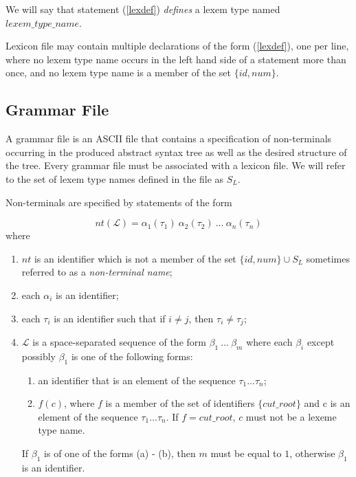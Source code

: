\documentclass[a4paper,10pt]{article}
\begin{document}
We will say that statement (\ref{lexdef}) \textit{defines} a lexem type named $lexem\_type\_name$.

Lexicon file may contain multiple declarations of the form (\ref{lexdef}), one per line, where no lexem type name occurs in the left hand side of a statement more than once, and no lexem type name is a member of the set $\{id, num\}  $.
 
\subsection{Grammar File}\label{gf}
A grammar file is an ASCII file that contains a specification of non-terminals occurring in the produced abstract syntax tree as well as the desired structure of the tree. Every grammar file must be associated with a lexicon file. We will refer to the set of lexem type names defined in the file as $S_L$.  

Non-terminals are specified  by  statements of the form 

\begin{equation}\label{nontd}
nt(\mathcal{L}) = \alpha_1(\tau_1)~\alpha_2(\tau_2)~\ldots~\alpha_n(\tau_n) 
\end{equation}
where 
\begin{enumerate}
\item $nt$ is an identifier which is not a member of the set $\{id,num\}\cup S_L$ sometimes referred to as a \textit{non-terminal name};
\item each $\alpha_i$  is an identifier;
\item each $\tau_i$ is an identifier such that if $i \not=j$, then $\tau_i \not= \tau_j$;
\item $\mathcal{L}$ is a  space-separated sequence  of the form $\beta_1~\ldots~\beta_m$ where
  each  $\beta_i$ except possibly $\beta_1$   
is one of the following forms:
\begin{enumerate}
\item an identifier that is an element of the sequence   $\tau_1\ldots \tau_n$;
\item $f(c)$, where $f$ is a member of the set of identifiers $\{cut\_root\}$ and c is an element of  the sequence   $\tau_1\ldots \tau_n$.
If $f = cut\_root$, $c$ must not be a lexeme type name. 
\end{enumerate} 
 If $\beta_1$ is of one of the forms (a) - (b), then $m$ must be equal to $1$, otherwise $\beta_1$ is an identifier.
\end{enumerate}
\end{document}

